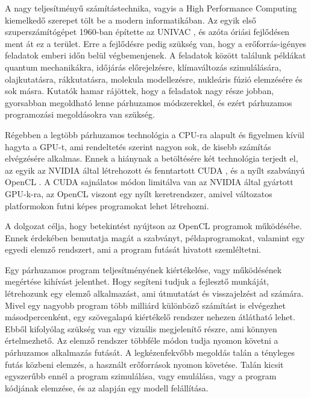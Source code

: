 
A nagy teljesítményű számítástechnika, vagyis a High Performance Computing kiemelkedő szerepet tölt be a modern informatikában. Az egyik első szuperszámítógépet 1960-ban építette az UNIVAC \cite{larc}, és azóta óriási fejlődésen ment át ez a terület. Erre a fejlődésre pedig szükség van, hogy a erőforrás-igényes feladatok emberi időn belül végbemenjenek. A feladatok között találunk példákat quantum mechanikákra, időjárás előrejelzésre, klímaváltozás szimulálására, olajkutatásra, rákkutatásra, molekula modellezésre, nukleáris fúzió elemzésére és sok másra. Kutatók hamar rájöttek, hogy a feladatok nagy része jobban, gyorsabban megoldható lenne párhuzamos módszerekkel, és ezért párhuzamos programozási megoldásokra van szükség.

Régebben a legtöbb párhuzamos technológia a CPU-ra alapult és figyelmen kívül hagyta a GPU-t, ami rendeltetés szerint nagyon sok, de kisebb számítás elvégzésére alkalmas. Ennek a hiánynak a betöltésére két technológia terjedt el, az egyik az NVIDIA által létrehozott és fenntartott CUDA \cite{cuda}, és a nyílt szabványú OpenCL \cite{opencl}. A CUDA sajnálatos módon limitálva van az NVIDIA által gyártott GPU-k-ra, az OpenCL viszont egy nyílt keretrendszer, amivel változatos platformokon futni képes programokat lehet létrehozni.

 A dolgozat célja, hogy betekintést nyújtson az OpenCL programok működésébe. Ennek érdekében bemutatja magát a szabványt, példaprogramokat, valamint egy egyedi elemző rendszert, ami a program futását hivatott szemléltetni.

Egy párhuzamos program teljesítményének kiértékelése, vagy működésének megértése kihívást jelenthet. Hogy segíteni tudjuk a fejlesztő munkáját, létrehozunk egy elemző alkalmazást, ami útmutatást és visszajelzést ad számára. Mivel egy nagyobb program több milliárd különböző számítást is elvégezhet másodpercenként, egy szövegalapú kiértékelő rendszer nehezen átlátható lehet. Ebből kifolyólag szükség van egy vizuális megjelenítő részre, ami könnyen értelmezhető. Az elemző rendszer többféle módon tudja nyomon követni a párhuzamos alkalmazás futását. A legkézenfekvőbb megoldás talán a tényleges futás közbeni elemzés, a használt erőforrások nyomon követése. Talán kicsit egyszerűbb ennél a program szimulálása, vagy emulálása, vagy a program kódjának elemzése, és az alapján egy modell felállítása.
